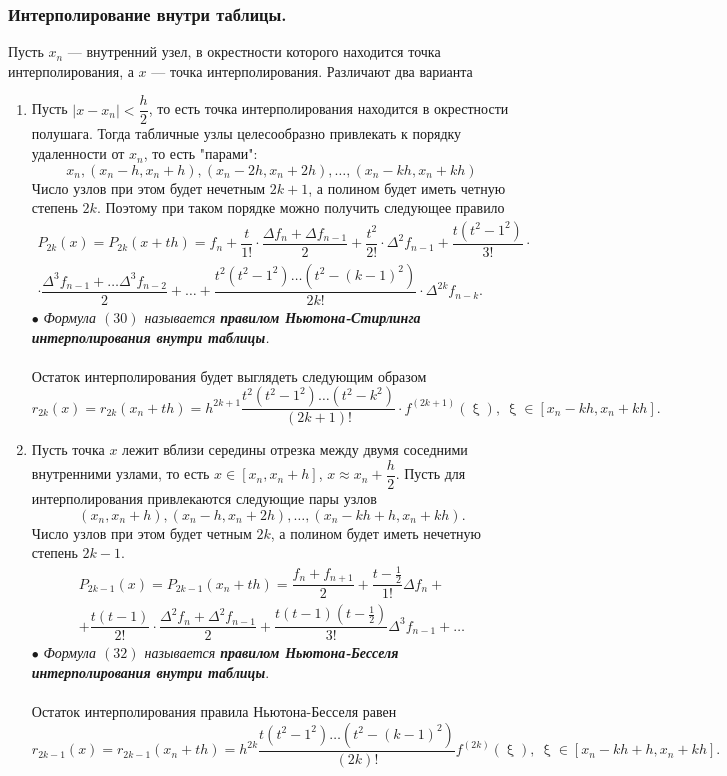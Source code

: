 \documentclass[a4paper, 12pt]{report}
\numberwithin{equation}{section}
\renewcommand{\xi}{\upxi}
\begin{document}
	\subsubsection{Интерполирование внутри таблицы.}
	Пусть $x_n$ --- внутренний узел, в окрестности которого находится точка интерполирования, а $x$ --- точка интерполирования.
	Различают два варианта
	\begin{enumerate}
		\item Пусть $|x-x_n| < \dfrac{h}{2}$, то есть точка интерполирования находится в окрестности полушага. Тогда табличные узлы целесообразно привлекать к порядку удаленности от $x_n$, то есть "парами": $$x_n, (x_n - h, x_n+h), (x_n-2h, x_n + 2h), \ldots, (x_n - kh, x_n + kh)$$
		Число узлов при этом будет нечетным $2k+1$, а полином будет иметь четную степень $2k$. Поэтому при таком порядке можно получить следующее правило \begin{multline}
			P_{2k}(x) = P_{2k}(x+th) = f_n + \dfrac{t}{1!}\cdot \dfrac{\Delta f_n + \Delta f_{n-1}}{2}+ \dfrac{t^2}{2!}\cdot \Delta ^2 f_{n-1} +\dfrac{t(t^2 - 1^2)}{3!}\cdot\\ \cdot\dfrac{\Delta ^3 f_{n-1}+\ldots \Delta^3 f_{n-2}}{2} +\ldots + \dfrac{t^2(t^2 - 1^2)\ldots (t^2 - (k-1)^2)}{2k!}\cdot \Delta^{2k}f_{n-k}.
		\end{multline}
		$\bullet$ \textit{Формула $(30)$ называется \textbf{правилом Ньютона-Стирлинга интерполирования внутри таблицы}.}\\\\
		Остаток интерполирования будет выглядеть следующим образом 
		\begin{equation}
			r_{2k}(x) = r_{2k}(x_n + th) = h^{2k+1} \dfrac{t^2(t^2-1^2)\ldots (t^2 - k^2)}{(2k+1)!}\cdot f^{(2k+1)}(\xi),\ \xi \in [x_n - kh, x_n + kh].
		\end{equation}
		\item Пусть точка $x$ лежит вблизи середины отрезка между двумя соседними внутренними узлами, то есть $x\in [x_n, x_n + h]$, $x\approx x_n + \dfrac h2$. Пусть для интерполирования привлекаются следующие пары узлов $$(x_n, x_n + h), (x_n - h, x_n + 2h), \ldots, (x_n-kh + h, x_n + kh).$$
		Число узлов при этом будет четным $2k$, а полином будет иметь нечетную степень $2k-1$. 
		\begin{multline}
			P_{2k-1}(x) = P_{2k-1}(x_n+th) = \dfrac{f_n + f_{n+1}}{2} + \dfrac{t-\frac12}{1!}\Delta f_n +\\+ \dfrac{t(t-1)}{2!}\cdot \dfrac{\Delta^2 f_n + \Delta^2 f_{n-1}}{2} + \dfrac{t(t-1)(t-\frac12)}{3!} \Delta^3 f_{n-1} + \ldots
		\end{multline}
		$\bullet$ \textit{Формула $(32)$ называется \textbf{правилом Ньютона-Бесселя интерполирования внутри таблицы}}.\\\\
		Остаток интерполирования правила Ньютона-Бесселя равен
		\begin{equation}
			r_{2k-1}(x) = r_{2k-1}(x_n + th) = h^{2k} \dfrac{t(t^2-1^2)\ldots (t^2 - (k-1)^2)}{(2k)!} f^{(2k)}(\xi),\ \xi \in [x_n - kh + h,x_n + kh].
		\end{equation}
	\end{enumerate}
\end{document}
